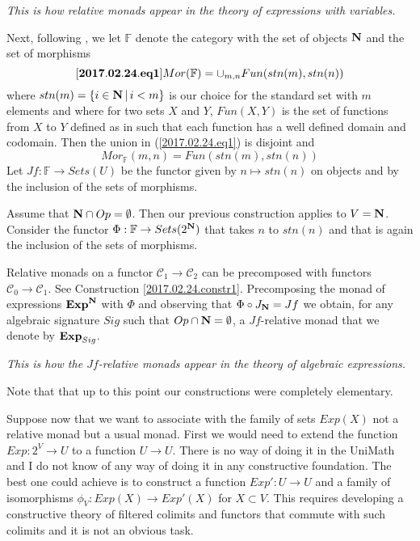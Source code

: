 \documentclass[12pt]{amsart}
\newenvironment{eq}{\begin{equation}}{\end{equation}}
\newcommand{\llabel}[1]{\label{#1}[{\bf #1}]}
\newcommand{\sr}{\rightarrow}
\newcommand{\nn}{{\bf N\rm}}
\newcommand{\nat}{\nn}
\newcommand{\C}{{\mathcal C}}
\newcommand{\FF}{{\mathbb F}}
\begin{document}
{\em This is how relative monads appear in the theory of expressions with variables.}

Next, following \cite{FPT}, we let $\FF$ denote the category with the set of objects $\nat$ and the set of morphisms 
%
\begin{eq}
\llabel{2017.02.24.eq1}
Mor(\FF)=\cup_{m,n}Fun(stn(m),stn(n))
\end{eq}
%
where $stn(m)=\{i\in\nat\,|\,i<m\}$ is our choice for the standard set with $m$ elements and where for two sets $X$ and $Y$, $Fun(X,Y)$ is the set of functions from $X$ to $Y$ defined as in \cite[p.81]{Bourbaki.Sets} such that each function has a well defined domain and codomain. Then the union in (\ref{2017.02.24.eq1}) is disjoint and 
%
$$Mor_{\FF}(m,n)=Fun(stn(m),stn(n))$$
%
Let $Jf:\FF\sr Sets(U)$ be the functor given by $n\mapsto  stn(n)$ on objects and by the inclusion of the sets of morphisms. 

Assume that $\nat\cap Op=\emptyset$. Then our previous construction applies to $V=\nat$. Consider the functor $\Phi:\FF\sr Sets(2^{\nat})$ that takes $n$ to $stn(n)$ and that is again the inclusion of the sets of morphisms. 

Relative monads on a functor $\C_1\sr \C_2$ can be precomposed with functors $\C_0\sr\C_1$. See Construction \ref{2017.02.24.constr1}. Precomposing the monad of expressions ${\bf Exp}^{\nat}$ with $\Phi$ and observing that $\Phi\circ J_{\nat}=Jf$ we obtain, for any algebraic signature $Sig$ such that $Op\cap \nat=\emptyset$, a $Jf$-relative monad that we denote by ${\bf Exp}_{Sig}$. 

{\em This is how the $Jf$-relative monads appear in the theory of algebraic expressions.} 

Note that that up to this point our constructions were completely elementary. 

Suppose now that we want to associate with the family of sets $Exp(X)$ not a relative monad but a usual monad. First we would need to extend the function $Exp:2^V\sr U$ to a function $U\sr U$. There is no way of doing it in the UniMath and I do not know of any way of doing it in any constructive foundation. The best one could achieve is to construct a function $Exp':U\sr U$ and a family of isomorphisms $\phi_V:Exp(X)\sr Exp'(X)$ for $X\subset  V$. This requires developing a constructive theory of filtered colimits and functors that commute with such colimits and it is not an obvious task.  
\end{document}
